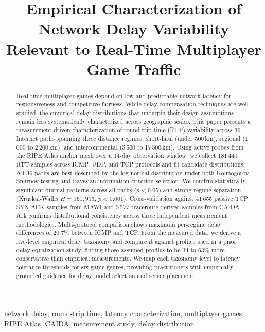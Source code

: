 \documentclass[conference]{IEEEtran}
\begin{document}
\title{Empirical Characterization of Network Delay Variability Relevant to Real-Time Multiplayer Game Traffic}

\author{
}

\maketitle

\begin{abstract}
Real-time multiplayer games depend on low and predictable network latency for responsiveness and competitive fairness. While delay compensation techniques are well studied, the empirical delay distributions that underpin their design assumptions remain less systematically characterized across geographic scales. This paper presents a measurement-driven characterization of round-trip time (RTT) variability across 36 Internet paths spanning three distance regimes: short-haul (under 500\,km), regional (1\,000 to 2\,200\,km), and intercontinental (5\,500 to 17\,500\,km). Using active probes from the RIPE Atlas anchor mesh over a 14-day observation window, we collect 181\,440 RTT samples across ICMP, UDP, and TCP protocols and fit candidate distributions. All 36 paths are best described by the log-normal distribution under both Kolmogorov-Smirnov testing and Bayesian information criterion selection. We confirm statistically significant diurnal patterns across all paths ($p < 0.05$) and strong regime separation (Kruskal-Wallis $H = 160{,}913$, $p < 0.001$). Cross-validation against 41\,655 passive TCP SYN-ACK samples from MAWI and 5\,577 traceroute-derived samples from CAIDA Ark confirms distributional consistency across three independent measurement methodologies. Multi-protocol comparison shows maximum per-regime delay differences of 20.7\% between ICMP and TCP. From the measured data, we derive a five-level empirical delay taxonomy and compare it against profiles used in a prior delay equalization study, finding those assumed profiles to be 34 to 63\% more conservative than empirical measurements. We map each taxonomy level to latency tolerance thresholds for six game genres, providing practitioners with empirically grounded guidance for delay model selection and server placement.
\end{abstract}

\begin{IEEEkeywords}
network delay, round-trip time, latency characterization, multiplayer games, RIPE Atlas, CAIDA, measurement study, delay distribution
\end{IEEEkeywords}
\end{document}

